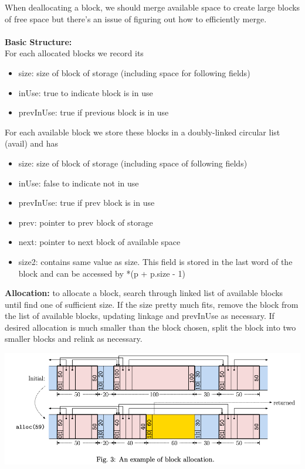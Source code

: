 \documentclass{article}
\begin{document}
  When deallocating a block, we should merge available space to create large blocks of free space but there's an issue of figuring out how to efficiently merge.\\ \\
  \textbf{Basic Structure:} \\
  For each allocated blocks we record its 
  \begin{itemize}[noitemsep]
    \item size: size of block of storage (including space for following fields)
      \item inUse: true to indicate block is in use
      \item prevInUse: true if previous block is in use
  \end{itemize}
  For each available block we store these blocks in a doubly-linked circular list (avail) and has 
  \begin{itemize}[noitemsep]
    \item size: size of block of storage (including space of following fields)
      \item inUse: false to indicate not in use
      \item prevInUse: true if prev block is in use
      \item prev: pointer to prev block of storage
      \item next: pointer to next block of available space
      \item size2: contains same value as size. This field is stored in the last word of the block and can be accessed by *(p + p.size - 1)
  \end{itemize}
  \textbf{Allocation: }to allocate a block, search through linked list of available blocks until find one of sufficient size. If the size pretty much fits, remove the block from the list of available blocks, updating linkage and prevInUse as necessary. If desired allocation is much smaller than the block chosen, split the block into two smaller blocks and relink as necessary.
  \begin{center}
  \includegraphics[scale=0.3]{MemoryAllocation}
  \end{center}
\end{document}
